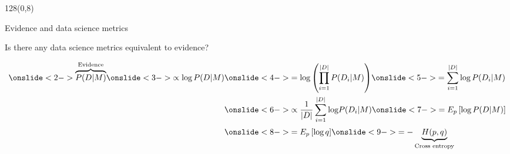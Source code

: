 \documentclass[shownotes]{beamer}
\begin{document}
\begin{frame}
 \begin{textblock}{128}(0,8)
\begin{center}
 \large Evidence and data science metrics
\end{center}
\end{textblock}
\vspace{0.5cm}

\begin{center}
 \normalsize Is there any data science metrics equivalent to evidence?
\end{center}


\begin{equation*}
 \begin{split}
\onslide<2->{\overbrace{P(D|M)}^{\text{Evidence}} }
\onslide<3->{\propto \text{log} \, P(D|M) }
&\onslide<4->{= \text{log} \left( \prod_{i=1}^{|D|} P(D_i|M) \right) }
\onslide<5->{=  \sum_{i=1}^{|D|} \text{log} \, P(D_i|M)} \\
&\onslide<6->{\propto  \frac{1}{|D|} \sum_{i=1}^{|D|} \text{log} P(D_i|M)}
\onslide<7->{= E_p \left[ \text{log} \, P(D|M) \right] }  \\[2pt]
& \onslide<8->{= E_p \left[ \text{log} \, q \right] }  
\onslide<9->{= - \underbrace{H(p,q)}_{\text{Cross entropy}} } \\
\end{split}
\end{equation*}


 
\end{frame}
\end{document}

